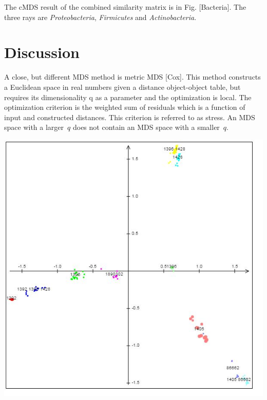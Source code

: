 \documentclass[10pt,a4paper]{article}
\begin{document}
The cMDS result of the combined similarity matrix is in Fig. [Bacteria].
The three rays are {\it Proteobacteria}, {\it Firmicutes} and {\it Actinobacteria}.


\section{Discussion}

A close, but different MDS method is metric MDS [Cox].
This method constructs a Euclidean space in real numbers given a distance object-object table,
but requires its dimensionality q as a parameter and the optimization is local.
The optimization criterion is the weighted sum of residuals which is a function of input and constructed distances.
This criterion is referred to as stress.
 An MDS space with a larger~$q$ does not contain an MDS space with a smaller~$q$.





\includegraphics [scale=0.7] {Bacillus_cereus.JPG}
\end{document}
